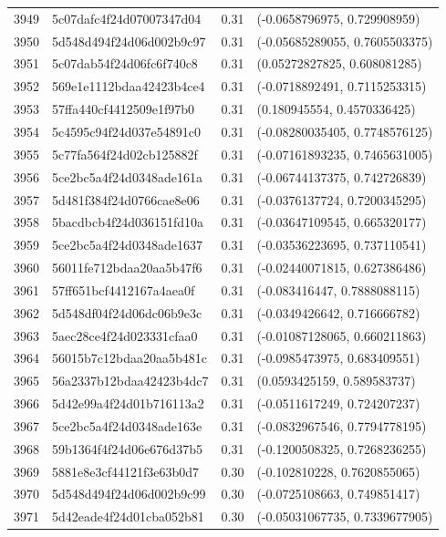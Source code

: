 \begin{table}[ht]
\begin{tabular}{rlrl}
  3949 & 5c07dafc4f24d07007347d04 & 0.31 & (-0.0658796975, 0.729908959) \\ 
  3950 & 5d548d494f24d06d002b9c97 & 0.31 & (-0.05685289055, 0.7605503375) \\ 
  3951 & 5c07dab54f24d06fc6f740c8 & 0.31 & (0.05272827825, 0.608081285) \\ 
  3952 & 569e1e1112bdaa42423b4ce4 & 0.31 & (-0.0718892491, 0.7115253315) \\ 
  3953 & 57ffa440cf4412509e1f97b0 & 0.31 & (0.180945554, 0.4570336425) \\ 
  3954 & 5c4595c94f24d037e54891c0 & 0.31 & (-0.08280035405, 0.7748576125) \\ 
  3955 & 5c77fa564f24d02cb125882f & 0.31 & (-0.07161893235, 0.7465631005) \\ 
  3956 & 5ce2bc5a4f24d0348ade161a & 0.31 & (-0.06744137375, 0.742726839) \\ 
  3957 & 5d481f384f24d0766cae8e06 & 0.31 & (-0.0376137724, 0.7200345295) \\ 
  3958 & 5bacdbcb4f24d036151fd10a & 0.31 & (-0.03647109545, 0.665320177) \\ 
  3959 & 5ce2bc5a4f24d0348ade1637 & 0.31 & (-0.03536223695, 0.737110541) \\ 
  3960 & 56011fe712bdaa20aa5b47f6 & 0.31 & (-0.02440071815, 0.627386486) \\ 
  3961 & 57ff651bcf4412167a4aea0f & 0.31 & (-0.083416447, 0.7888088115) \\ 
  3962 & 5d548df04f24d06dc06b9e3c & 0.31 & (-0.0349426642, 0.716666782) \\ 
  3963 & 5aec28ce4f24d023331cfaa0 & 0.31 & (-0.01087128065, 0.660211863) \\ 
  3964 & 56015b7c12bdaa20aa5b481c & 0.31 & (-0.0985473975, 0.683409551) \\ 
  3965 & 56a2337b12bdaa42423b4dc7 & 0.31 & (0.0593425159, 0.589583737) \\ 
  3966 & 5d42e99a4f24d01b716113a2 & 0.31 & (-0.0511617249, 0.724207237) \\ 
  3967 & 5ce2bc5a4f24d0348ade163e & 0.31 & (-0.0832967546, 0.7794778195) \\ 
  3968 & 59b1364f4f24d06e676d37b5 & 0.31 & (-0.1200508325, 0.7268236255) \\ 
  3969 & 5881e8e3cf44121f3e63b0d7 & 0.30 & (-0.102810228, 0.7620855065) \\ 
  3970 & 5d548d494f24d06d002b9c99 & 0.30 & (-0.0725108663, 0.749851417) \\ 
  3971 & 5d42eade4f24d01cba052b81 & 0.30 & (-0.05031067735, 0.7339677905) \\ 

\end{tabular}
\end{table}
